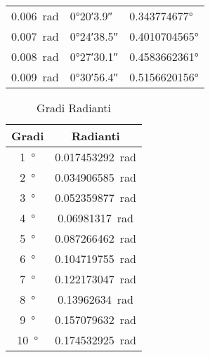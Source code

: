 {{\begin{tabular}{rll}
\SI{0.006}{\radian}	&\ang{0;20;3.9}  &\ang[round-precision=\lungarrotandamento,round-mode=places]{0.343774677}  \\
\SI{0.007}{\radian}	&\ang{0;24;38.5}  &\ang[round-precision=\lungarrotandamento,round-mode=places]{0.4010704565}  \\
\SI{0.008}{\radian}	&\ang{0;27;30.1}  &\ang[round-precision=\lungarrotandamento,round-mode=places]{0.4583662361}  \\
\SI{0.009}{\radian}	&\ang{0;30;56.4}  &\ang[round-precision=\lungarrotandamento,round-mode=places]{0.5156620156}  \\
\bottomrule
\end{tabular}}\par}
\begin{table}
	\begin{subtable}[b]{.3\linewidth}
	\centering
	\begin{tabular}{cc}
		\toprule
		Gradi & Radianti \\
		\midrule
		\SI{1}{\degree}&\SI[round-precision=\extralungarrotandamento,round-mode=places]{0.017453292}{\radian}  \\ 
		\SI{2}{\degree}&\SI[round-precision=\extralungarrotandamento,round-mode=places]{0.034906585}{\radian}  \\ 
		\SI{3}{\degree}&\SI[round-precision=\extralungarrotandamento,round-mode=places]{0.052359877}{\radian}  \\ 
		\SI{4}{\degree}&\SI[round-precision=\extralungarrotandamento,round-mode=places]{0.06981317}{\radian}  \\ 
		\SI{5}{\degree}&\SI[round-precision=\extralungarrotandamento,round-mode=places]{0.087266462}{\radian}  \\ 
		\SI{6}{\degree}&\SI[round-precision=\extralungarrotandamento,round-mode=places]{0.104719755}{\radian}  \\ 
		\SI{7}{\degree}&\SI[round-precision=\extralungarrotandamento,round-mode=places]{0.122173047}{\radian}  \\ 
		\SI{8}{\degree}&\SI[round-precision=\extralungarrotandamento,round-mode=places]{0.13962634}{\radian}  \\ 
		\SI{9}{\degree}&\SI[round-precision=\extralungarrotandamento,round-mode=places]{0.157079632}{\radian}  \\ 
		\SI{10}{\degree}&\SI[round-precision=\extralungarrotandamento,round-mode=places]{0.174532925}{\radian}  \\ 
		\bottomrule
	\end{tabular}
\caption{Gradi Radianti}

\end{subtable}
\end{table}
